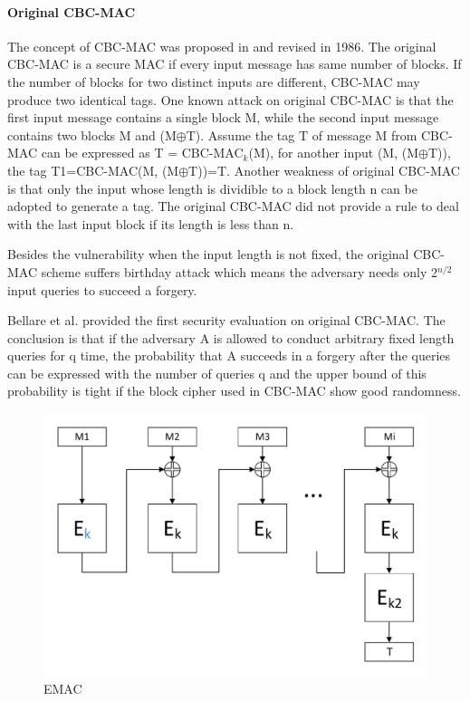 \documentclass{article}
\begin{document}
\paragraph{Original CBC-MAC}
The concept of CBC-MAC was proposed in \cite{cbc-mac} and revised in 1986. The original CBC-MAC is a secure MAC if every input message has same number of blocks. If the number of blocks for two distinct inputs are different, CBC-MAC may produce two identical tags. One known attack on original CBC-MAC is that the first input message contains a single block M, while the second input message contains two blocks M and (M$\oplus$T). Assume the tag T of message M from CBC-MAC can be expressed as T = CBC-MAC$_k$(M), for another input (M, (M$\oplus$T)), the tag T1=CBC-MAC(M, (M$\oplus$T))=T. 
Another weakness of original CBC-MAC is that only the input whose length is dividible to a block length n can be adopted to generate a tag. The original CBC-MAC did not provide a rule to deal with the last input block if its length is less than n.   

Besides the vulnerability when the input length is not fixed, the original CBC-MAC scheme suffers birthday attack which means the adversary needs only 2$^{n/2}$ input queries to succeed a forgery. 

Bellare et al. provided the first security evaluation on original CBC-MAC\cite{cbc1994}. The conclusion is that if the adversary A is allowed to conduct arbitrary fixed length queries for q time, the probability that A succeeds in a forgery after the queries can be expressed with the number of queries q and the upper bound of this probability is tight if the block cipher used in CBC-MAC show good randomness.  
\begin{figure}[htbp]
\centering
\includegraphics[scale=0.5]{./diagrams/emac.pdf}
\caption{EMAC}
\label{fig:EMAC}
\end{figure}
\end{document}

